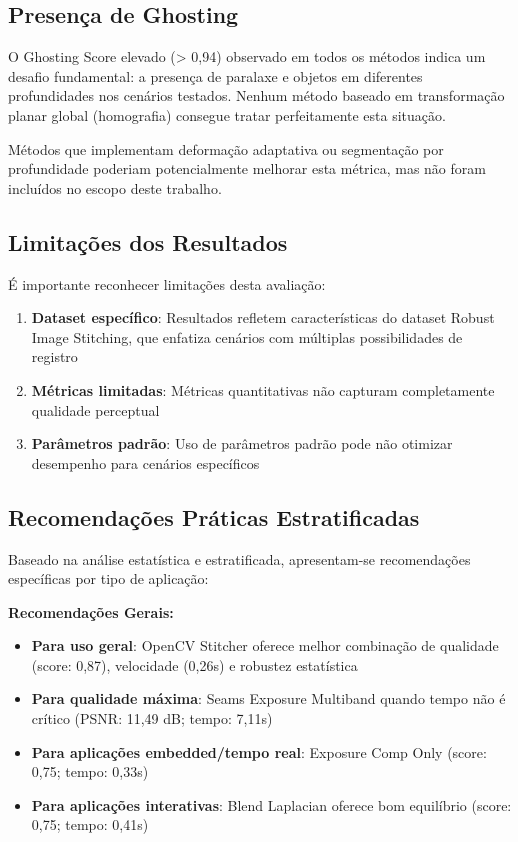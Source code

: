 \subsection{Presença de Ghosting}

O Ghosting Score elevado (> 0,94) observado em todos os métodos indica um desafio fundamental: a presença de paralaxe e objetos em diferentes profundidades nos cenários testados. Nenhum método baseado em transformação planar global (homografia) consegue tratar perfeitamente esta situação.

Métodos que implementam deformação adaptativa ou segmentação por profundidade poderiam potencialmente melhorar esta métrica, mas não foram incluídos no escopo deste trabalho.

\subsection{Limitações dos Resultados}

É importante reconhecer limitações desta avaliação:

\begin{enumerate}
    \item \textbf{Dataset específico}: Resultados refletem características do dataset Robust Image Stitching, que enfatiza cenários com múltiplas possibilidades de registro
    \item \textbf{Métricas limitadas}: Métricas quantitativas não capturam completamente qualidade perceptual
    \item \textbf{Parâmetros padrão}: Uso de parâmetros padrão pode não otimizar desempenho para cenários específicos
\end{enumerate}

\subsection{Recomendações Práticas Estratificadas}

Baseado na análise estatística e estratificada, apresentam-se recomendações específicas por tipo de aplicação:

\textbf{Recomendações Gerais:}
\begin{itemize}
    \item \textbf{Para uso geral}: OpenCV Stitcher oferece melhor combinação de qualidade (score: 0,87), velocidade (0,26s) e robustez estatística
    \item \textbf{Para qualidade máxima}: Seams Exposure Multiband quando tempo não é crítico (PSNR: 11,49 dB; tempo: 7,11s)
    \item \textbf{Para aplicações embedded/tempo real}: Exposure Comp Only (score: 0,75; tempo: 0,33s)
    \item \textbf{Para aplicações interativas}: Blend Laplacian oferece bom equilíbrio (score: 0,75; tempo: 0,41s)
\end{itemize}

